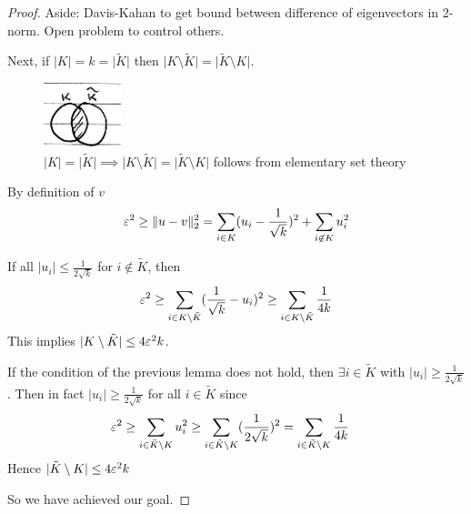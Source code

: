 \begin{proof}
    Aside: Davis-Kahan to get bound between difference of eigenvectors in 2-norm. Open problem
    to control others.
    
    Next, if $\lvert K \rvert = k = \lvert \tilde{K} \rvert$ then
    $\lvert K \setminus \tilde{K}\rvert = \lvert \tilde{K} \setminus K \rvert$.
    
    \begin{figure}[H]
        \centering
        \includegraphics[width=0.2\textwidth]{figures/9-10-3.png}
        \caption{$\lvert K \rvert = \lvert \tilde{K} \rvert \implies \lvert K \setminus \tilde{K} \rvert = \lvert \tilde{K} \setminus K \rvert$ follows from elementary set theory}
    \end{figure}
    
    By definition of $v$
    \begin{align}
        \varepsilon^2
        \geq \|u - v\|_2^2
        = \sum_{i \in K} (u_i - \frac{1}{\sqrt{k}})^2 + \sum_{i \not\in K} u_i^2
    \end{align}
    
    \begin{lemma}
        If all $\lvert u_i \rvert \leq \frac{1}{2 \sqrt{k}}$ for $i \not\in \tilde{K}$, 
        then
        \begin{align}
            \varepsilon^2 
            \geq \sum_{i \in K \setminus \tilde{K}} (\frac{1}{\sqrt{k}} - u_i)^{2} 
            \geq \sum_{i \in K \setminus \tilde{K}} \frac{1}{4k}
        \end{align}
        This implies $\lvert K \setminus \tilde{K} \rvert \leq 4 \varepsilon^2 k$.
    \end{lemma}
    
    \begin{lemma}
        If the condition of the previous lemma does not hold, then $\exists i \in \tilde{K}$
        with $\lvert u_i \rvert \geq \frac{1}{2 \sqrt{k}}$. Then in fact $\lvert u_i \rvert \geq \frac{1}{2 \sqrt{k}}$ for all $i \in \tilde{K}$ since
        \begin{align}
            \varepsilon^2
            &\geq \sum_{i \in \tilde{K} \setminus K} u_i^2
            \geq \sum_{i \in \tilde{K} \setminus K} (\frac{1}{2 \sqrt{k}})^2
            = \sum_{i \in \tilde{K} \setminus K} \frac{1}{4k}
        \end{align}
        Hence $\lvert \tilde{K} \setminus K \rvert \leq 4 \varepsilon^2 k$
    \end{lemma}
    So we have achieved our goal.
    

\end{proof}
